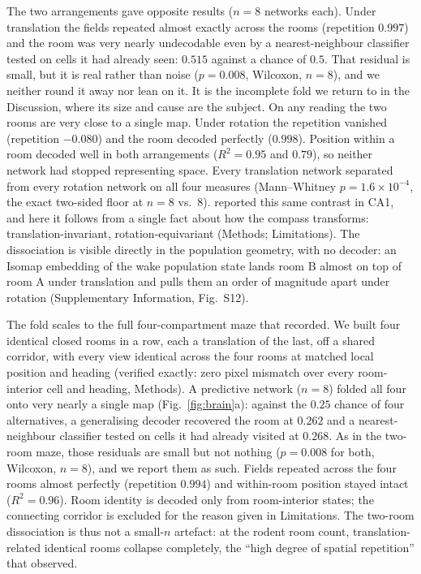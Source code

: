 \documentclass[9pt,lineno]{elife}
\begin{document}
The two arrangements gave opposite results ($n=8$ networks each). Under translation the fields
repeated almost exactly across the rooms (repetition $0.997$) and the room was very nearly
undecodable even by a nearest-neighbour classifier tested on cells it had already seen: $0.515$
against a chance of $0.5$. That residual is small, but it is real rather than noise ($p = 0.008$,
Wilcoxon, $n = 8$), and we neither round it away nor lean on it. It is the incomplete fold we
return to in the Discussion, where its size and cause are the subject. On any reading the two rooms
are very close to a single map. Under rotation the repetition vanished (repetition $-0.080$) and the
room decoded perfectly ($0.998$). Position within a room decoded well in both arrangements
($R^2 = 0.95$ and $0.79$), so neither network had stopped representing space. Every translation
network separated from every rotation network on all four measures (Mann--Whitney
$p = 1.6\times10^{-4}$, the exact two-sided floor at $n=8$ vs.\ $8$). \citet{grieves2016} reported
this same contrast in CA1, and here it follows from a single fact about how the compass transforms:
translation-invariant, rotation-equivariant (Methods; Limitations). The dissociation is visible
directly in the population geometry, with no decoder: an Isomap embedding of the wake population
state lands room B almost on top of room A under translation and pulls them an order of magnitude
apart under rotation (Supplementary Information, Fig.~S12).

The fold scales to the full four-compartment maze that \citet{spiers2015} recorded. We built four
identical closed rooms in a row, each a translation of the last, off a shared corridor, with every
view identical across the four rooms at matched local position and heading (verified exactly: zero
pixel mismatch over every room-interior cell and heading, Methods). A predictive network ($n=8$)
folded all four onto very nearly a single map (Fig.~\ref{fig:brain}a): against the $0.25$ chance of four alternatives, a
generalising decoder recovered the room at $0.262$ and a nearest-neighbour classifier tested on
cells it had already visited at $0.268$. As in the two-room maze, those residuals are small but not
nothing ($p = 0.008$ for both, Wilcoxon, $n = 8$), and we report them as such. Fields repeated across
the four rooms almost perfectly (repetition $0.994$) and within-room position stayed intact
($R^2 = 0.96$). Room identity is decoded only from room-interior states; the connecting corridor is
excluded for the reason given in Limitations. The two-room dissociation is thus not a small-$n$
artefact: at the rodent room count, translation-related identical rooms collapse completely, the
``high degree of spatial repetition'' that \citet{spiers2015} observed.
\end{document}
